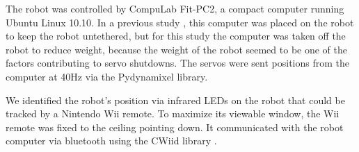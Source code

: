The robot was controlled by CompuLab Fit-PC2, a compact computer running Ubuntu Linux 10.10. 
In a previous study \cite{yos:clune}, this computer was placed on the robot to keep the robot untethered, but for this study the computer was taken off the robot to reduce weight, because the weight of the robot seemed to be one of the factors contributing to servo shutdowns.
The servos were sent positions from the computer at 40Hz via the Pydynamixel library. 


We identified the robot's position via infrared LEDs on the robot that could be tracked by a Nintendo Wii remote.
To maximize its viewable window, the Wii remote was fixed to the ceiling pointing down. It communicated with the robot computer via bluetooth using the CWiid library \cite{yos:clune}. 



